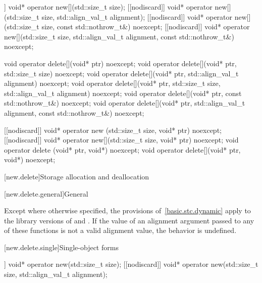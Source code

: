 \begin{codeblock}
[[nodiscard]] void* operator new[](std::size_t size);
[[nodiscard]] void* operator new[](std::size_t size, std::align_val_t alignment);
[[nodiscard]] void* operator new[](std::size_t size, const std::nothrow_t&) noexcept;
[[nodiscard]] void* operator new[](std::size_t size, std::align_val_t alignment,
                                   const std::nothrow_t&) noexcept;

void  operator delete[](void* ptr) noexcept;
void  operator delete[](void* ptr, std::size_t size) noexcept;
void  operator delete[](void* ptr, std::align_val_t alignment) noexcept;
void  operator delete[](void* ptr, std::size_t size, std::align_val_t alignment) noexcept;
void  operator delete[](void* ptr, const std::nothrow_t&) noexcept;
void  operator delete[](void* ptr, std::align_val_t alignment, const std::nothrow_t&) noexcept;

[[nodiscard]] void* operator new  (std::size_t size, void* ptr) noexcept;
[[nodiscard]] void* operator new[](std::size_t size, void* ptr) noexcept;
void  operator delete  (void* ptr, void*) noexcept;
void  operator delete[](void* ptr, void*) noexcept;
\end{codeblock}

[new.delete]{Storage allocation and deallocation}

[new.delete.general]{General}

\pnum
Except where otherwise specified, the provisions of~\ref{basic.stc.dynamic}
apply to the library versions of  and .
If the value of an alignment argument
passed to any of these functions
is not a valid alignment value,
the behavior is undefined.

\newcommand{\replaceabledesc}[1]{%
A \Cpp{} program may define functions with #1 of these function signatures,
and thereby displace the default versions defined by the
\Cpp{} standard library.%
}

[new.delete.single]{Single-object forms}

%
\begin{itemdecl}
[[nodiscard]] void* operator new(std::size_t size);
[[nodiscard]] void* operator new(std::size_t size, std::align_val_t alignment);
\end{itemdecl}

